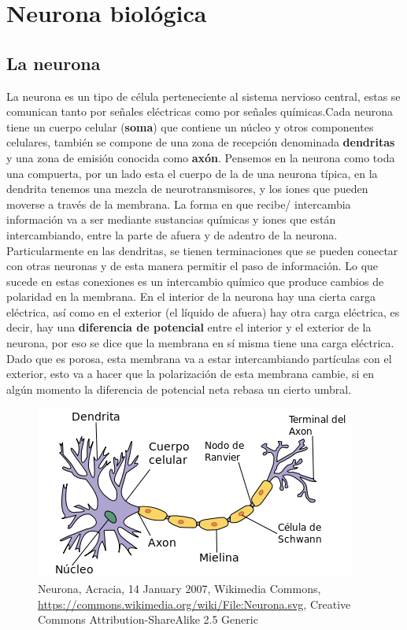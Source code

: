 \section{Neurona biológica}
\subsection{La neurona}
La neurona es un tipo de célula perteneciente al sistema nervioso central, estas se comunican tanto por señales eléctricas como por señales químicas.Cada neurona tiene un cuerpo celular (\textbf{soma}) que contiene un núcleo y otros componentes celulares, también se compone de una zona de recepción denominada \textbf{dendritas} y una zona de emisión conocida como \textbf{axón}. Pensemos en la neurona como toda una compuerta, por un lado esta el cuerpo de la de una neurona típica, en la dendrita tenemos una mezcla de neurotransmisores, y los iones que pueden moverse a través de la membrana. La forma en que recibe/ intercambia información va a ser mediante sustancias químicas y iones que están intercambiando, entre la parte de afuera y de adentro de la neurona. Particularmente en las dendritas, se tienen terminaciones que se pueden conectar con otras neuronas y de esta manera permitir el paso de información. Lo que sucede en estas conexiones es un intercambio químico que produce cambios de polaridad en la membrana. En el interior de la neurona hay una cierta carga eléctrica, así como en el exterior (el líquido de afuera) hay otra carga eléctrica, es decir, hay una \textbf{diferencia de potencial} entre el interior y el exterior de la neurona, por eso se dice que la membrana en sí misma tiene una carga eléctrica. Dado que es porosa, esta membrana  va a estar intercambiando partículas con el exterior, esto va a hacer que la polarización de esta membrana cambie, si en algún momento la diferencia de potencial neta rebasa un cierto umbral.

\begin{figure}[h]
 \centering
 \includegraphics[scale=0.5]{../Figuras/neuronaPartes.png}
 \caption{Neurona, Acracia, 14 January 2007, Wikimedia Commons, \url{https://commons.wikimedia.org/wiki/File:Neurona.svg}, Creative Commons Attribution-ShareAlike 2.5 Generic}
 \label{fig:neuronaP}
\end{figure}


